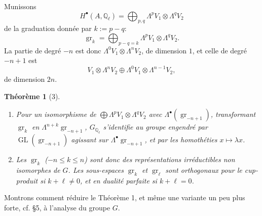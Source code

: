 \documentclass[11pt]{article}
\newcommand{\Q}{\mathbb Q}
\newcommand{\GL}{\operatorname{GL}}
\newcommand{\gr}{\operatorname{gr}}
\theoremstyle{deligne}
\newtheorem*{theorem*}{Théorème}
\newcommand{\heading}[1]{\vspace{0.7em}\noindent{\bfseries #1}\quad}
\begin{document}
Munissons
\[
H^\bullet(A,\Q_\ell)=\bigoplus_{p,q}\Lambda^p V_1\otimes\Lambda^q V_2
\]
de la graduation donnée par $k:=p-q$:
\begin{equation}\tag{1.1}
\gr_k=\bigoplus_{p-q=k}\Lambda^p V_1\otimes\Lambda^q V_2 .
\end{equation}
La partie de degré $-n$ est donc $\Lambda^0V_1\otimes\Lambda^nV_2$, de dimension $1$, et celle de degré $-n+1$ est
\[
V_1\otimes\Lambda^nV_2\oplus\Lambda^0V_1\otimes\Lambda^{n-1}V_2,
\]
de dimension $2n$.

\begin{theorem*}[3]
\begin{enumerate}[label=(\roman*)]
\item Pour un isomorphisme de $\bigoplus\Lambda^pV_1\otimes\Lambda^qV_2$ avec $\Lambda^\bullet(\gr_{-n+1})$, transformant $\gr_k$ en $\Lambda^{n+k}\gr_{-n+1}$, $G_{\Q_\ell}$ s'identifie au groupe engendré par $\GL(\gr_{-n+1})$ agissant sur $\Lambda^\bullet\gr_{-n+1}$, et par les homothéties $x\mapsto \lambda x$.
\item Les $\gr_k$ ($-n\le k\le n$) sont donc des représentations irréductibles non isomorphes de $G$. Les sous-espaces $\gr_k$ et $\gr_\ell$ sont orthogonaux pour le cup-produit si $k+\ell\ne0$, et en dualité parfaite si $k+\ell=0$.
\end{enumerate}
\end{theorem*}

\heading{2.}
Montrons comment réduire le Théorème 1, et même une variante un peu plus forte, cf. \S5, à l'analyse du groupe $G$.
\end{document}
